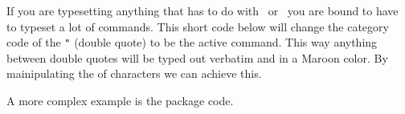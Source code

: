 If you are typesetting anything that has to do with \tex\ or \latex\ you are bound to have to typeset a lot of commands. This short code below will change the category code of the \texttt{"} (double quote) to be the active command. This way anything between double quotes will be  typed out verbatim and in a Maroon color. By mainipulating the  of characters we can achieve this.


\begin{comment}
\bgroup
\def\Meaningless#1>{}
\catcode`\"=\active
\def\startV{\leavevmode\begingroup
  \ifdim 0pt=\lastskip\penalty200 \fi
  \catcode`\{11 \catcode`\}11 \catcode`\%11
  \moreV}
\long\def\moreV#1"{%
  \def\LtxCode{#1}%
  \ignorespaces
      \expandafter\Meaningless\meaning\LtxCode
      \unskip%
  \endgroup}
\let"\startV

\catcode`\<=\active
\def<#1>{\ensuremath{\langle\mbox{\textsl{#1}}\rangle}}

\noindent Testing it out with a few commands we get 
"\catcode", "\char" ,"\def" etc. We will revert back to this short example later on in our book, when you have learned a bit more about macros and programming \tex\. Note that this also affects "quotes".

\egroup
\end{comment}

A more complex example is the  package code.

